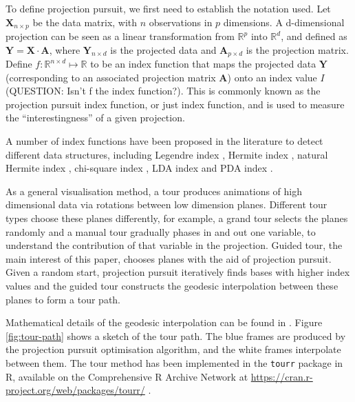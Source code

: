 \documentclass[12pt]{article}
\begin{document}
To define projection pursuit, we first need to establish the notation used. Let \(\mathbf{X}_{n \times p}\) be the data matrix, with \(n\) observations in \(p\) dimensions. A d-dimensional projection can be seen as a linear transformation from \(\mathbb{R}^p\) into \(\mathbb{R}^d\), and defined as \(\mathbf{Y} = \mathbf{X} \cdot \mathbf{A}\), where \(\mathbf{Y}_{n \times d}\) is the projected data and \(\mathbf{A}_{p\times d}\) is the projection matrix. Define \(f: \mathbb{R}^{n \times d} \mapsto \mathbb{R}\) to be an index function that maps the projected data \(\mathbf{Y}\) (corresponding to an associated projection matrix \(\mathbf{A}\)) onto an index value \(I\) (QUESTION: Isn't f the index function?). This is commonly known as the projection pursuit index function, or just index function, and is used to measure the ``interestingness'' of a given projection.

A number of index functions have been proposed in the literature to detect different data structures, including Legendre index \citep{friedman1974projection}, Hermite index \citep{hall1989polynomial}, natural Hermite index \citep{cook1993projection}, chi-square index \citep{posse1995projection}, LDA index \citep{lee2005projection} and PDA index \citep{lee2010projection}.

As a general visualisation method, a tour produces animations of high dimensional data via rotations between low dimension planes. Different tour types choose these planes differently, for example, a grand tour \citep{cook2008grand} selects the planes randomly and a manual tour \citep{cook1997manual} gradually phases in and out one variable, to understand the contribution of that variable in the projection. Guided tour, the main interest of this paper, chooses planes with the aid of projection pursuit. Given a random start, projection pursuit iteratively finds bases with higher index values and the guided tour constructs the geodesic interpolation between these planes to form a tour path.

Mathematical details of the geodesic interpolation can be found in \citet{buja2005computational}. Figure \ref{fig:tour-path} shows a sketch of the tour path. The blue frames are produced by the projection pursuit optimisation algorithm, and the white frames interpolate between them. The tour method has been implemented in the \texttt{tourr} package in R, available on the Comprehensive R Archive Network at \url{https://cran.r-project.org/web/packages/tourr/} \citep{wickham2011tourrpackage}.
\end{document}
